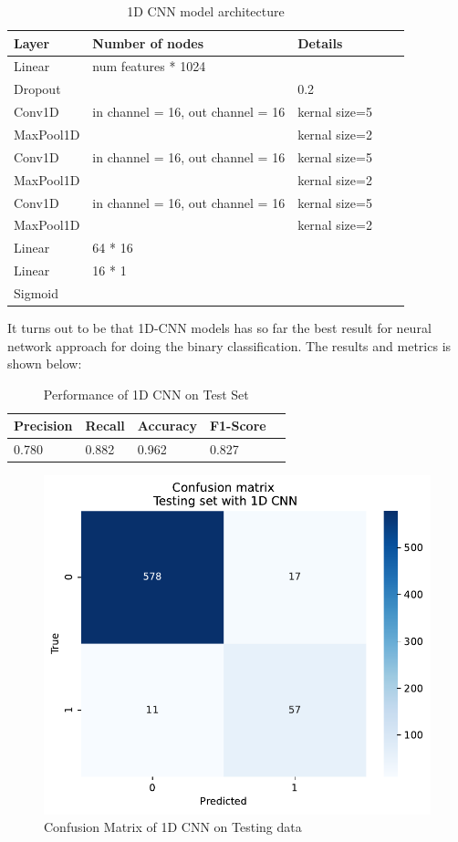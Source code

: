 \documentclass[10pt,letterpaper]{article}
\begin{document}
\begin{table}[H]
\centering
\footnotesize
\begin{tabular}{lllll}
\toprule
\textbf{Layer} & \textbf{Number of nodes} & \textbf{Details} \\
\midrule
Linear & num features * 1024 & \\
Dropout & & 0.2 \\
Conv1D & in channel = 16, out channel = 16 & kernal size=5\\
MaxPool1D &  & kernal size=2\\
Conv1D & in channel = 16, out channel = 16 & kernal size=5\\
MaxPool1D & & kernal size=2\\
Conv1D & in channel = 16, out channel = 16 & kernal size=5\\
MaxPool1D & & kernal size=2\\
Linear & 64 * 16 & \\
Linear & 16 * 1 & \\
Sigmoid & & \\
\bottomrule
\end{tabular}
\caption{1D CNN model architecture}
\end{table}
It turns out to be that 1D-CNN models has so far the best result for neural network approach for doing the binary classification. The results and metrics is shown below:

\begin{table}[H]
\centering
\footnotesize
\begin{tabular}{lllll}
\toprule
\textbf{Precision} & \textbf{Recall} & \textbf{Accuracy} &  \textbf{F1-Score}\\
\midrule
0.780 & 0.882 & 0.962 & 0.827  \\
\bottomrule
\end{tabular}
\caption{Performance of 1D CNN on Test Set}%
\end{table}

\begin{figure}[H]
    \centering
    \includegraphics[width=0.5\linewidth]{plots/1dcnn_confusion_matrix.pdf}
    \caption{Confusion Matrix of 1D CNN on Testing data}
    \label{fig:confusion-matrix-1dcnn}
\end{figure}
\end{document}
